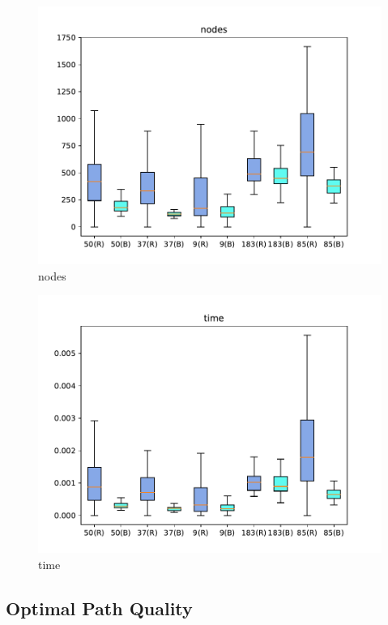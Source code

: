 \documentclass[smallcondensed]{svjour3}     %
\begin{document}
\begin{figure}
\centering
\includegraphics[scale=0.45]{nodes_taken.pdf}%
\caption{nodes}     
\label{fig:nodes}
\end{figure}

\begin{figure}
\centering
\includegraphics[scale=0.45]{time.pdf}%
\caption{time}     
\label{fig:time}
\end{figure}

\subsection{Optimal Path Quality}
\end{document}
